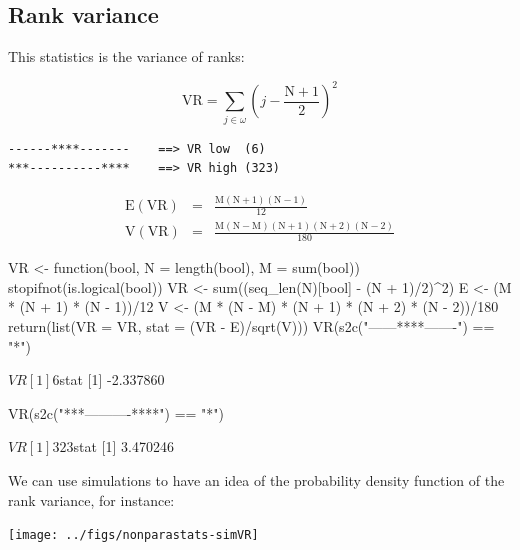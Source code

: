 \documentclass{article}
\begin{document}
\subsection{Rank variance}

This statistics is the variance of ranks:

$$
\mathrm{VR} = \sum_{j \in \omega}{(j - \mathrm{\frac{N+1}{2}})^2}
$$

\begin{verbatim}
------****-------    ==> VR low  (6)
***----------****    ==> VR high (323)
\end{verbatim}

\begin{eqnarray*}
\mathrm{E(VR)} & = & \mathrm{\frac{M(N + 1)(N-1)}{12}} \\
\mathrm{V(VR)} & = & \mathrm{\frac{M(N - M)(N + 1)(N + 2)(N - 2)}{180}}
\end{eqnarray*}

\begin{Schunk}
\begin{Sinput}
 VR <- function(bool, N = length(bool), M = sum(bool)) {
     stopifnot(is.logical(bool))
     VR <- sum((seq_len(N)[bool] - (N + 1)/2)^2)
     E <- (M * (N + 1) * (N - 1))/12
     V <- (M * (N - M) * (N + 1) * (N + 2) * (N - 2))/180
     return(list(VR = VR, stat = (VR - E)/sqrt(V)))
 }
 VR(s2c("------****-------") == "*")
\end{Sinput}
\begin{Soutput}
$VR
[1] 6

$stat
[1] -2.337860
\end{Soutput}
\begin{Sinput}
 VR(s2c("***----------****") == "*")
\end{Sinput}
\begin{Soutput}
$VR
[1] 323

$stat
[1] 3.470246
\end{Soutput}
\end{Schunk}

We can use simulations to have an idea of the probability density function
of the rank variance, for instance:

\begin{Schunk}
\end{Schunk}
\texttt{[image: ../figs/nonparastats-simVR]}
\end{document}
